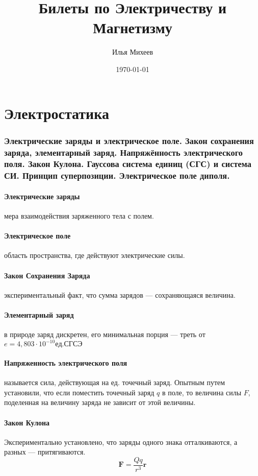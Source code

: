 \documentclass[a4paper,12pt]{article} %
\author{Илья Михеев}
\title{Билеты по Электричеству и Магнетизму}
\date{\today}
\begin{document}

\maketitle 

\part{Электростатика}
\section{Электрические заряды и электрическое поле. Закон сохранения заряда, элементарный заряд. Напряжённость электрического поля. Закон Кулона. Гауссова система единиц (СГС) и система СИ. Принцип суперпозиции. Электрическое поле диполя.}
\subsection{Электрические заряды} мера взаимодействия заряженного тела с полем.
\subsection{Электрическое поле} область пространства, где действуют электрические силы.
\subsection{Закон Сохранения Заряда} экспериментальный факт, что сумма зарядов --- сохраняющаяся величина.
\subsection{Элементарный заряд} в природе заряд дискретен, его минимальная порция --- треть от \\  $e = 4,803 \cdot 10^{-10} ед. СГСЭ$
\subsection{Напряженность электрического поля} называется сила, действующая на ед. точечный заряд. Опытным путем установили, что если поместить точечный заряд $q$ в поле, то величина силы $F$, поделенная на величину заряда не зависит от этой величины.
\subsection{Закон Кулона}  Экспериментально установлено, что заряды одного знака отталкиваются, а разных --- притягиваются.
\begin{equation}
	\textbf{F} = \frac{Qq}{r^3} \textbf{r}
\end{equation}
\end{document}
